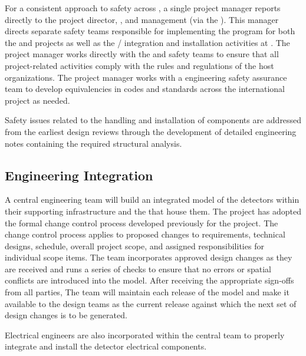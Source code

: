 For a consistent approach to safety across ,
a single project  manager reports directly 
to the  project director, , and 
management (via the  ).  This manager
directs separate safety teams responsible for implementing the 
  program for both the  
and  projects as well as the /
integration and installation activities at .  The 
project  manager works directly with the  
and  safety teams to ensure that all project-related 
activities comply with the rules and regulations of the host 
organizations.  The project  manager works with a  
engineering safety assurance team to develop
equivalencies in codes and standards across the international project
as needed.

Safety issues related to the handling 
and installation of components are addressed  
from the earliest design reviews through the development 
of detailed engineering notes containing the required
structural analysis.


\subsection{Engineering Integration}
\label{sec:dune_engineering}


A central  engineering team will build 
an integrated model of the detectors within their supporting
infrastructure and the  that house them.  
The  project has adopted 
the formal change control process developed previously for the 
 project.  The change control process applies to 
proposed changes to requirements, technical designs, 
schedule, overall project scope, and assigned responsibilities 
for individual scope items. 
The  team incorporates approved design changes as they 
are received and runs a series of checks to ensure that no errors 
or spatial conflicts are introduced into the model. After receiving the 
appropriate sign-offs from all parties, 
The  team will maintain  
each release  of the model and make it available to the 
design teams as the current release against which the next set 
of design changes is to be generated. 

Electrical engineers are also incorporated within the central
 team to properly integrate and install 
the detector electrical components.  

